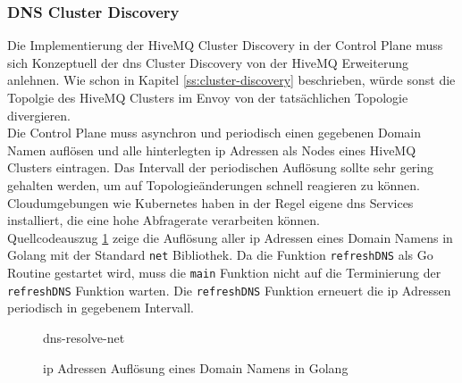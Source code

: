 \subsubsection{DNS Cluster Discovery} \label{ss:dns-discovery}
Die Implementierung der HiveMQ Cluster Discovery in der Control Plane muss sich Konzeptuell der \ac{dns} Cluster Discovery von der HiveMQ Erweiterung anlehnen. Wie schon in Kapitel \ref{ss:cluster-discovery} beschrieben, würde sonst die Topolgie des HiveMQ Clusters im Envoy von der tatsächlichen Topologie divergieren.
\\
Die Control Plane muss asynchron und periodisch einen gegebenen Domain Namen auflösen und alle hinterlegten \ac{ip} Adressen als Nodes eines HiveMQ Clusters eintragen. Das Intervall der periodischen Auflösung sollte sehr gering gehalten werden, um auf Topologieänderungen schnell reagieren zu können.
Cloudumgebungen wie Kubernetes haben in der Regel eigene \ac{dns} Services installiert, die eine hohe Abfragerate verarbeiten können.
\\
Quellcodeauszug \ref{code:dns-resolve-net} zeige die Auflösung aller \ac{ip} Adressen eines Domain Namens in Golang mit der Standard \verb|net| Bibliothek. Da die Funktion \verb|refreshDNS| als Go Routine gestartet wird, muss die \verb|main| Funktion nicht auf die Terminierung der \verb|refreshDNS| Funktion warten. Die \verb|refreshDNS| Funktion erneuert die \ac{ip} Adressen periodisch in gegebenem Intervall.
\begin{figure}
    {dns-resolve-net}
    \caption{\ac{ip} Adressen Auflösung eines Domain Namens in Golang}
    \label{code:dns-resolve-net}
\end{figure}

